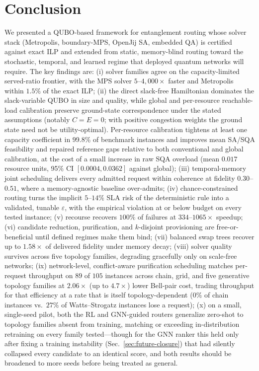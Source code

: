 \documentclass[twocolumn]{article}
\begin{document}
\section{Conclusion}
\label{sec:conclusion}

We presented a QUBO-based framework for entanglement routing whose
solver stack (Metropolis, boundary-MPS, OpenJij SA, embedded QA) is
certified against exact ILP and extended from static, memory-blind
routing toward the stochastic, temporal, and learned regime that
deployed quantum networks will require.  The key findings are:
(i) solver families agree on the capacity-limited served-ratio
frontier, with the MPS solver $5$--$4{,}000\times$
faster and Metropolis within $1.5\%$ of the exact ILP; (ii) the direct slack-free Hamiltonian dominates the slack-variable
QUBO in size and quality, while global and per-resource reachable-load
calibration preserve ground-state correspondence under the stated
assumptions (notably $C=E=0$; with positive congestion weights the
ground state need not be utility-optimal).
Per-resource calibration tightens at least one capacity
coefficient in 99.8\% of benchmark instances and improves mean SA/SQA
feasibility and repaired reference gaps relative to both conventional
and global calibration, at the cost of a small increase in raw SQA
overload (mean $0.017$ resource units, 95\% CI $[0.0004, 0.0362]$
against global);
(iii) temporal-memory joint scheduling delivers
every admitted request within coherence at fidelity $0.30$--$0.51$,
where a memory-agnostic baseline over-admits; (iv) chance-constrained
routing turns the implicit $5$--$14\%$ SLA risk of the deterministic
rule into a validated, tunable $\varepsilon$, with the empirical
violation at or below budget on every tested instance; (v) recourse
recovers $100\%$ of failures at $334$--$1065\times$ speedup; (vi)
candidate reduction, purification, and $k$-disjoint provisioning are
free-or-beneficial until defined regimes make them bind; (vii)
balanced swap trees recover up to $1.58\times$ of delivered fidelity
under memory decay; (viii) solver quality survives across five
topology families, degrading gracefully only on scale-free networks;
(ix) network-level, conflict-aware purification scheduling matches
per-request throughput on $89$ of $105$ instances across chain, grid,
and five generative topology families at $2.06\times$ (up to
$4.7\times$) lower Bell-pair cost, trading throughput for that
efficiency at a rate that is itself topology-dependent ($0\%$ of
chain instances vs.\ $27\%$ of Watts--Strogatz instances lose a
request); (x) on a small, single-seed
pilot, both the RL and GNN-guided routers generalize zero-shot to
topology families absent from training, matching or exceeding
in-distribution retraining on every family tested---though for the
GNN ranker this held only after fixing a training instability
(Sec.~\ref{sec:future-closure}) that had silently collapsed every
candidate to an identical score, and both results should be broadened
to more seeds before being treated as general.
\end{document}
